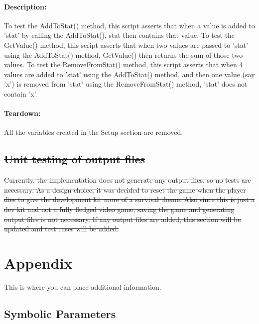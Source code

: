 \documentclass[12pt, titlepage]{article}
\DeclareRobustCommand{\hsout}[1]{\texorpdfstring{\sout{#1}}{#1}}
\begin{document}
{\begin{itemize}
	
\end{itemize}
\paragraph{Description: }
To test the AddToStat() method, this script asserts that when a value is added to 'stat' by calling the AddToStat(), stat then contains that value.
\newline
To test the GetValue() method, this script asserts that when two values are passed to 'stat' using the AddToStat() method, GetValue() then returns the sum of those two values.
\newline
To test the RemoveFromStat() method, this script asserts that when 4 values are added to 'stat' using the AddToStat() method, and then one value (say 'x') is removed from 'stat' using the RemoveFromStat() method, 'stat' does not contain 'x'.
\paragraph{Teardown: } All the variables created in the Setup section are removed.
}
\subsection{\hsout{Unit testing of output files}}		

\sout{Currently, the implementation does not generate any output files, so no tests are necessary. As a design choice, it was decided to reset the game when the player dies to give the development kit more of a survival theme. Also since this is just a dev kit and not a fully fledged video game, saving the game and generating output files is not necessary. If any output files are added, this section will be updated and test cases will be added.}



%
%
%
%
%
\newpage
\section{Appendix}

This is where you can place additional information.

\subsection{Symbolic Parameters}
\end{document}
